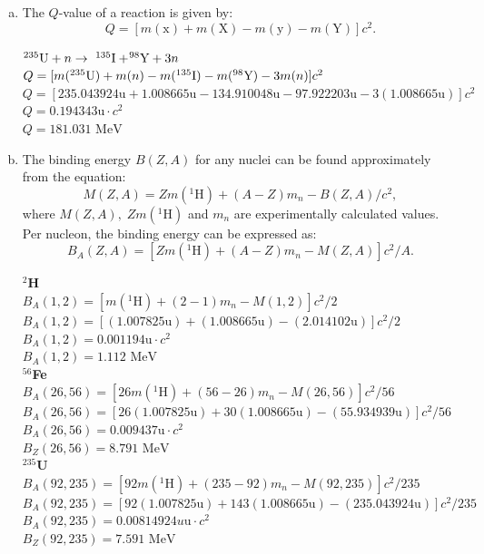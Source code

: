 \documentclass{report}
\newcommand{\tab}{\-\hspace{1.5cm}}
\begin{document}
\begin{enumerate}[a)]

\item 

The $Q$-value of a reaction is given by:$$Q=[m(\text{x})+m(\text{X})-m(\text{y})-m(\text{Y})]c^{2}.$$

\begin{spacing}{1.75}	
$^{235}\text{\normalfont{U}}+n \rightarrow  \-\ ^{135}\text{\normalfont{I}}+ \! ^{98}\text{\normalfont{Y}}+3n$\\
	\tab $Q = [m(^{235}\text{\normalfont{U}})+m(n)-m(^{135}\text{\normalfont{I}})-m(^{98}\text{\normalfont{Y}})-3m(n)]c^{2}$\\
	\tab $Q = [235.043924\text{u}+1.008665\text{u}-134.910048\text{u}-97.922203\text{u}-3(1.008665\text{u})]c^{2}$\\
	\tab $Q = 0.194343\text{u} \cdot c^{2}$\\
	\tab $\boxed{Q = 181.031 \text{ MeV}}$ 
\end{spacing}


\item 

The binding energy $B(Z,A)$ for any nuclei can be found approximately from the equation:$$M(Z,A) = Zm(^{1}\text{H})+(A-Z)m_{n}-B(Z,A)/c^{2},$$ where $M(Z,A),\; Zm(^{1}\text{H})$ and $m_{n}$ are experimentally calculated values. Per nucleon, the binding energy can be expressed as: $$B_{A}(Z,A) = [Zm(^{1}\text{H})+(A-Z)m_{n}-M(Z,A)]c^{2}/A.$$

\begin{spacing}{1.75}

\textbf{$^{2}$H}\\
$B_{A}(1,2) = [m(^{1}\text{H})+(2-1)m_{n}-M(1,2)]c^{2}/2$\\
$B_{A}(1,2) = [(1.007825\text{u})+(1.008665\text{u})-(2.014102\text{u})]c^{2}/2$\\
$B_{A}(1,2) = 0.001194\text{u} \cdot c^{2}$\\
$\boxed{B_{A}(1,2) = 1.112\text{ MeV}}$\\
\textbf{$^{56}$Fe}\\
$B_{A}(26,56) = [26m(^{1}\text{H})+(56-26)m_{n}-M(26,56)]c^{2}/56$\\
$B_{A}(26,56) = [26(1.007825\text{u})+30(1.008665\text{u})-(55.934939\text{u})]c^{2}/56$\\
$B_{A}(26,56) = 0.009437\text{u} \cdot c^{2}$\\
$\boxed{B_{Z}(26,56) = 8.791\text{ MeV}}$\\
\textbf{$^{235}$U}\\
$B_{A}(92,235) = [92m(^{1}\text{H})+(235-92)m_{n}-M(92,235)]c^{2}/235$\\
$B_{A}(92,235) = [92(1.007825\text{u})+143(1.008665\text{u})-(235.043924\text{u})]c^{2}/235$\\
$B_{A}(92,235) = 0.00814924 u\text{u} \cdot c^{2}$\\
$\boxed{B_{Z}(92,235) = 7.591\text{ MeV}}$
\end{spacing}

\end{enumerate}
\end{document}
